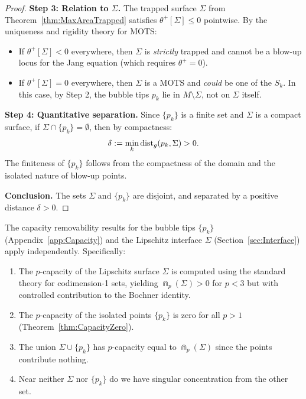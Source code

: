 \begin{proof}
\textbf{Step 3: Relation to $\Sigma$.}
The trapped surface $\Sigma$ from Theorem~\ref{thm:MaxAreaTrapped} satisfies $\theta^+[\Sigma] \le 0$ pointwise. By the uniqueness and rigidity theory for MOTS:
\begin{itemize}
    \item If $\theta^+[\Sigma] < 0$ everywhere, then $\Sigma$ is \emph{strictly} trapped and cannot be a blow-up locus for the Jang equation (which requires $\theta^+ = 0$).
    \item If $\theta^+[\Sigma] = 0$ everywhere, then $\Sigma$ is a MOTS and \emph{could} be one of the $S_k$. In this case, by Step 2, the bubble tips $p_k$ lie in $M \setminus \Sigma$, not on $\Sigma$ itself.
\end{itemize}

\textbf{Step 4: Quantitative separation.}
Since $\{p_k\}$ is a finite set and $\Sigma$ is a compact surface, if $\Sigma \cap \{p_k\} = \emptyset$, then by compactness:
\[
    \delta := \min_k \mathrm{dist}_g(p_k, \Sigma) > 0.
\]
The finiteness of $\{p_k\}$ follows from the compactness of the domain and the isolated nature of blow-up points.

\textbf{Conclusion.}
The sets $\Sigma$ and $\{p_k\}$ are disjoint, and separated by a positive distance $\delta > 0$.
\end{proof}

\begin{corollary}\label{cor:IndependentCapacity}
The capacity removability results for the bubble tips $\{p_k\}$ (Appendix~\ref{app:Capacity}) and the Lipschitz interface $\Sigma$ (Section~\ref{sec:Interface}) apply independently. Specifically:
\begin{enumerate}
    \item The $p$-capacity of the Lipschitz surface $\Sigma$ is computed using the standard theory for codimension-1 sets, yielding $\Cap_p(\Sigma) > 0$ for $p < 3$ but with controlled contribution to the Bochner identity.
    \item The $p$-capacity of the isolated points $\{p_k\}$ is zero for all $p > 1$ (Theorem~\ref{thm:CapacityZero}).
    \item The union $\Sigma \cup \{p_k\}$ has $p$-capacity equal to $\Cap_p(\Sigma)$ since the points contribute nothing.
    \item Near neither $\Sigma$ nor $\{p_k\}$ do we have singular concentration from the other set.
\end{enumerate}
\end{corollary}

